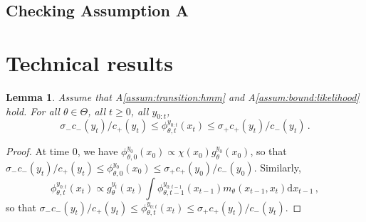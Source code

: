 \documentclass{article}
\newtheorem{lemma}[theorem]{Lemma}
\newcommand{\1}{\mathbbm{1}}
\newcommand{\rmd}{\ensuremath{\mathrm{d}}}
\begin{document}
\subsection*{Checking Assumption A}

\section{Technical results}
\begin{lemma}
\label{lem:bound:filter}
Assume that A\ref{assum:transition:hmm} and A\ref{assum:bound:likelihood} hold. For all $\theta\in\Theta$,  all $t\geq 0$, all $y_{0:t}$,
$$
\sigma_- c_-(y_t)/c_+(y_t)\leq \phi^{y_{0:t}}_{\theta,t}(x_{t})\leq \sigma_+ c_+(y_t)/c_-(y_t)\,.
$$
\end{lemma}
\begin{proof}
At time 0, we have $\phi^{y_{0}}_{\theta,0}(x_{0}) \propto \chi(x_0)g^{y_0}_\theta(x_0)$, so that $\sigma_- c_-(y_t)/c_+(y_t)\leq \phi^{y_{0}}_{\theta,0}(x_{0})\leq \sigma_+ c_+(y_0)/c_-(y_0)$. Similarly, 
$$
\phi^{y_{0:t}}_{\theta,t}(x_{t}) \propto g^{y_t}_\theta(x_t)\int \phi^{y_{0:t-1}}_{\theta,t-1}(x_{t-1})m_\theta(x_{t-1},x_t)\rmd x_{t-1}\,,
$$
so that $\sigma_- c_-(y_t)/c_+(y_t)\leq \phi^{y_{0:t}}_{\theta,t}(x_{t})\leq \sigma_+ c_+(y_t)/c_-(y_t)$.
\end{proof}
\end{document}
